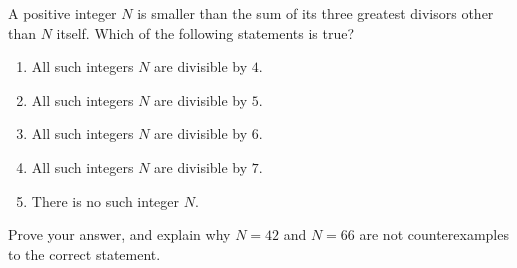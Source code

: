 A positive integer $N$ is smaller than the sum of its three greatest divisors other than $N$ itself. Which of the following statements is true?
\begin{enumerate}
\item[(A)] All such integers $N$ are divisible by $4$.
\item[(B)] All such integers $N$ are divisible by $5$.
\item[(C)] All such integers $N$ are divisible by $6$.
\item[(D)] All such integers $N$ are divisible by $7$.
\item[(E)] There is no such integer $N$.
\end{enumerate}
Prove your answer, and explain why $N=42$ and $N=66$ are not counterexamples to the correct statement.
